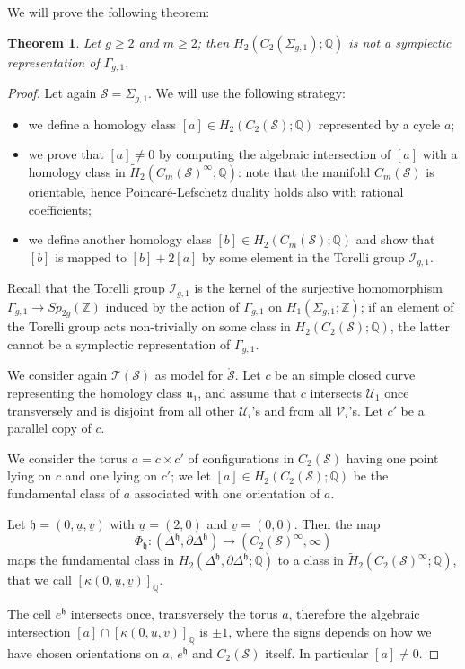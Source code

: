 \documentclass{amsart}
\theoremstyle{plain}
\newtheorem{thm}{Theorem}[section]
\theoremstyle{definition}
\newcommand{\Q}{\mathbb{Q}}
\renewcommand{\S}{\mathcal{S}}
\newcommand{\T}{\mathcal{T}}
\newcommand{\U}{\mathcal{U}}
\renewcommand{\u}{\mathfrak{u}}
\newcommand{\V}{\mathcal{V}}
\newcommand{\Z}{\mathbb{Z}}
\newcommand{\sg}{\Sigma_{g,1}}
\renewcommand{\gg}{\Gamma_{g,1}}
\newcommand{\cms}{C_m(\S)}
\newcommand{\tup}{\mathfrak{h}}
\newcommand{\tH}{\tilde{H}}
\newcommand{\pa}[1]{\left(#1\right)}
\newcommand{\mrS}{\mathring{\S}}
\newcommand{\uu}{\underline{u}}
\newcommand{\uv}{\underline{v}}
\begin{document}
We will prove the following theorem:
\begin{thm}
 \label{thm:counterexample}
 Let $g\geq 2$ and $m\geq 2$; then $H_2(C_2(\Sigma_{g,1});\Q)$ is not a symplectic
 representation of $\gg$.
\end{thm}
\begin{proof}
 Let again $\S=\Sigma_{g,1}$. We will use the following strategy:
 \begin{itemize}
  \item we define a homology class $[a]\in H_2(C_2(\S);\Q)$ represented by a cycle $a$;
  \item we prove that $[a]\neq 0$ by computing the algebraic intersection of
  $[a]$ with a homology class
  in $\tH_2(\cms^{\infty};\Q)$: note that the manifold
  $\cms$ is orientable, hence Poincaré-Lefschetz duality holds
  also with rational coefficients;
  \item we define another homology class $[b]\in H_2(\cms;\Q)$ and show that
  $[b]$ is mapped to $[b]+2[a]$ by some element in the Torelli group $\mathcal{I}_{g,1}$.
 \end{itemize}
Recall that the Torelli group $\mathcal{I}_{g,1}$ is the kernel of the surjective homomorphism
$\gg\to Sp_{2g}(\Z)$ induced by the action of $\gg$ on $H_1\pa{\sg;\Z}$; if an element of the Torelli group acts non-trivially on
some class in $H_2(C_2(\S);\Q)$, the latter cannot be a symplectic representation of $\gg$.

We consider again $\T(\S)$ as model for $\mrS$. Let $c$ be an simple closed curve
representing the homology class $\u_1$, and assume that $c$ intersects $\U_1$ once
transversely and is disjoint from all other $\U_i$'s and from all $\V_i$'s. Let $c'$
be a parallel copy of $c$.

We consider the torus $a=c\times c'$ of configurations in $C_2(\S)$ having one point lying on $c$ and
one lying on $c'$; we let $[a]\in H_2(C_2(\S);\Q)$ be the fundamental class of $a$ associated with one
orientation of $a$.

Let $\tup=(0,\uu,\uv)$ with $\uu=(2,0)$ and $\uv=(0,0)$.
Then the map
\[
\Phi_{\tup}\colon (\Delta^{\tup},\partial\Delta^{\tup})\to (C_2(\S)^{\infty},\infty)
\]
maps the fundamental class in $H_2(\Delta^{\tup},\partial\Delta^{\tup};\Q)$ to a
class in $\tH_2(C_2(\S)^{\infty};\Q)$, that we call $[\kappa(0,\uu,\uv)]_{\Q}$.

The cell $e^{\tup}$ intersects once, transversely the torus $a$, therefore the
algebraic intersection $[a]\cap[\kappa(0,\uu,\uv)]_{\Q}$ is $\pm 1$,
where the signs depends on how we have chosen orientations on $a$, $e^{\tup}$ and $C_2(\S)$ itself.
In particular $[a]\neq 0$.


\end{proof}
\end{document}
